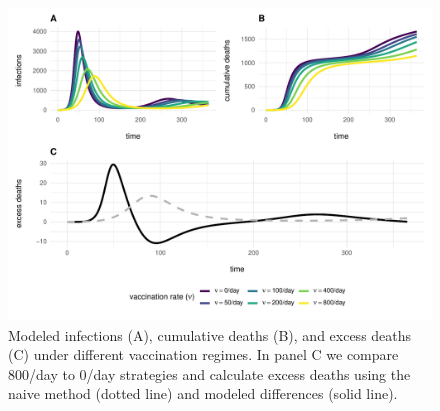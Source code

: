 \documentclass[11pt]{article}
\begin{document}
    \begin{figure}[b]
        \centering
        \includegraphics[width=\linewidth]{../3_figures/deaths_averted.pdf}
        \caption{Modeled infections (A), cumulative deaths (B), and excess deaths (C) under different vaccination regimes. In panel C we compare 800/day to 0/day strategies and calculate excess deaths using the naive method (dotted line) and modeled differences (solid line).}
    \end{figure}
\end{document}
